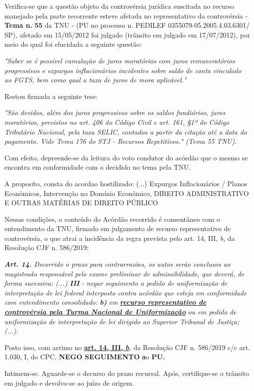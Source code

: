 \documentclass[12pt]{article}
\begin{document}
\justifying
\noindent Verifica-se que a questão objeto da controvérsia jurídica suscitada no recurso manejado pela parte recorrente esteve afetada no representativo da controvérsia - \textbf{Tema n. }\textbf{55} da TNU - (PU no processo n. PEDILEF 0355079-05.2005.4.03.6301/ SP),  afetado em 15/05/2012 foi julgado (trânsito em julgado em 17/07/2012), por meio do qual foi elucidada a seguinte questão:

\noindent \textit{"Saber se é possível cumulação de juros moratórios com juros remuneratórios progressivos e expurgos inflacionários incidentes sobre saldo de conta vinculado ao FGTS, bem como qual a taxa de juros de mora aplicável."}

\noindent Restou firmada a seguinte tese:

\noindent \textit{"São devidos, além dos juros progressivos sobre os saldos fundiários, juros moratórios, previstos no art. 406 do Código Civil e art. 161, §1º do Código Tributário Nacional, pela taxa SELIC, contados a partir da citação até a data do pagamento. Vide Tema 176 do STJ - Recursos Repetitivos." (Tema 55 TNU).}

\noindent Com efeito, depreende-se da leitura do voto condutor do acórdão que o mesmo se encontra em conformidade com o decidido no  tema pela TNU.

\noindent A proposito, consta do acordao hostilizado: (...) Expurgos Inflacionários / Planos Econômicos, Intervenção no Domínio Econômico, DIREITO ADMINISTRATIVO E OUTRAS MATÉRIAS DE DIREITO PÚBLICO

\noindent Nessas condições, o conteúdo do Acórdão recorrido é consentâneo com o entendimento da TNU, firmado em julgamento de recurso representativo de controvérsia, o que atrai a incidência da regra prevista pelo art. 14, III, \textit{b,} da Resolução CJF n. 586/2019:

\noindent \textit{\textbf{Art. 14.}}\textit{ Decorrido o prazo para contrarrazões, os autos serão conclusos ao magistrado responsável pelo exame preliminar de admissibilidade, que deverá, de forma sucessiva: (...) }\textit{\textbf{III }}\textit{- negar seguimento a pedido de uniformização de interpretação de lei federal interposto contra acórdão que esteja em conformidade com entendimento consolidado: }\textit{\textbf{b)}}\textit{ em }\uline{\textit{\textbf{recurso representativo de controvérsia pela Turma Nacional de Uniformização}}}\textit{ ou em pedido de uniformização de interpretação de lei dirigido ao Superior Tribunal de Justiça;(...).}

\noindent Posto isso, com arrimo no \uline{\textbf{art. 14, III, }}\uline{\textit{\textbf{b}}}\textit{,} da Resolução CJF n. 586/2019 c/c art. 1.030, I, do CPC, \textbf{NEGO SEGUIMENTO }\textbf{a}o\textbf{ PU}\textbf{.}

\noindent Intimem-se. Aguarde-se o decurso do prazo recursal. Após, certifique-se o trânsito em julgado e devolva-se ao juízo de origem.
\end{document}
